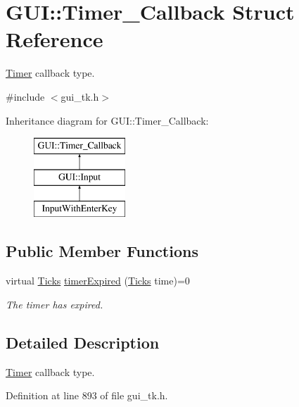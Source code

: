 \hypertarget{structGUI_1_1Timer__Callback}{\section{G\-U\-I\-:\-:Timer\-\_\-\-Callback Struct Reference}
\label{structGUI_1_1Timer__Callback}
}


\hyperlink{classGUI_1_1Timer}{Timer} callback type.  




{\ttfamily \#include $<$gui\-\_\-tk.\-h$>$}

Inheritance diagram for G\-U\-I\-:\-:Timer\-\_\-\-Callback\-:\begin{figure}[H]
\begin{center}
\leavevmode
\includegraphics[height=3.000000cm]{structGUI_1_1Timer__Callback}
\end{center}
\end{figure}
\subsection*{Public Member Functions}
\begin{DoxyCompactItemize}
\item 
virtual \hyperlink{namespaceGUI_af396fee5d5c26b98218f5803f85e3b65}{Ticks} \hyperlink{structGUI_1_1Timer__Callback_a4b5a610f3c4da4acd0bacda97b24e049}{timer\-Expired} (\hyperlink{namespaceGUI_af396fee5d5c26b98218f5803f85e3b65}{Ticks} time)=0
\begin{DoxyCompactList}\small\item\em The timer has expired. \end{DoxyCompactList}\end{DoxyCompactItemize}


\subsection{Detailed Description}
\hyperlink{classGUI_1_1Timer}{Timer} callback type. 

Definition at line 893 of file gui\-\_\-tk.\-h.



